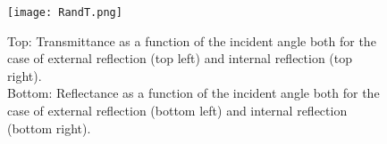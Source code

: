 \begin{figure}[t]
 \label{fig:Reflectance_transmittance}
     \begin{center}
     \texttt{[image: RandT.png]}
     \end{center}
     \caption{\footnotesize{Top: Transmittance as a function of the incident angle both for the case of external reflection (top left) and internal reflection (top right).\\
Bottom: Reflectance as a function of the incident angle both for the case of external reflection (bottom left) and internal reflection (bottom right).}}
\label{fig:reflectance_and_transmittance}
 \end{figure}






























































